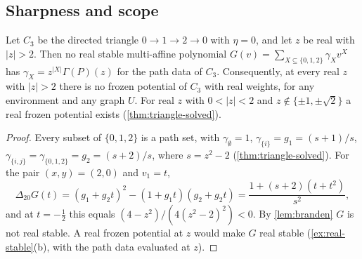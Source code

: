 \documentclass[final]{siamart0516}
\numberwithin{theorem}{section}
\numberwithin{equation}{section}
\theoremstyle{siamnonum}
\theoremstyle{plain}
\begin{document}
\subsection{Sharpness and scope}

\begin{proposition}\label{prop:triangle-band}
Let $C_3$ be the directed triangle $0\to1\to2\to0$ with $\eta=0$, and let $z$ be real with $|z|>2$. Then no real stable multi-affine polynomial $G(v)=\sum_{X\subseteq\{0,1,2\}}\gamma_Xv^X$ has $\gamma_X=z^{|X|}\Gamma(P)(z)$ for the path data of $C_3$. Consequently, at every real $z$ with $|z|>2$ there is no frozen potential of $C_3$ with real weights, for any environment and any graph $U$. For real $z$ with $0<|z|<2$ and $z\notin\{\pm1,\pm\sqrt2\}$ a real frozen potential exists \textup{(}\cref{thm:triangle-solved}\textup{)}.
\end{proposition}
\begin{proof}
Every subset of $\{0,1,2\}$ is a path set, with $\gamma_\emptyset=1$, $\gamma_{\{i\}}=g_1=(s+1)/s$, $\gamma_{\{i,j\}}=\gamma_{\{0,1,2\}}=g_2=(s+2)/s$, where $s=z^2-2$ (\cref{thm:triangle-solved}). For the pair $(x,y)=(2,0)$ and $v_1=t$,
\[
\Delta_{20}G(t)=(g_1+g_2t)^2-(1+g_1t)(g_2+g_2t)=\frac{1+(s+2)(t+t^2)}{s^2},
\]
and at $t=-\frac12$ this equals $(4-z^2)/(4(z^2-2)^2)<0$. By \cref{lem:branden} $G$ is not real stable. A real frozen potential at $z$ would make $G$ real stable (\cref{ex:real-stable}(b), with the path data evaluated at $z$).
\end{proof}
\end{document}
